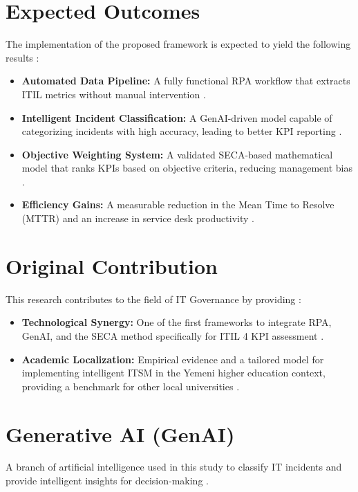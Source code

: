 \documentclass[12pt,a4paper,oneside]{report}
\begin{document}
\section{Expected Outcomes} 
The implementation of the proposed framework is expected to yield the following results \cite{almontaser2025}:
\begin{itemize}
    \item \textbf{Automated Data Pipeline:} A fully functional RPA workflow that extracts ITIL metrics without manual intervention \cite{almontaser2025}.
    \item \textbf{Intelligent Incident Classification:} A GenAI-driven model capable of categorizing incidents with high accuracy, leading to better KPI reporting \cite{almontaser2025}.
    \item \textbf{Objective Weighting System:} A validated SECA-based mathematical model that ranks KPIs based on objective criteria, reducing management bias \cite{almontaser2025}.
    \item \textbf{Efficiency Gains:} A measurable reduction in the Mean Time to Resolve (MTTR) and an increase in service desk productivity \cite{almontaser2025}.
\end{itemize}

\section{Original Contribution} 
This research contributes to the field of IT Governance by providing \cite{almontaser2025}:
\begin{itemize}
    \item \textbf{Technological Synergy:} One of the first frameworks to integrate RPA, GenAI, and the SECA method specifically for ITIL 4 KPI assessment \cite{almontaser2025}.
    \item \textbf{Academic Localization:} Empirical evidence and a tailored model for implementing intelligent ITSM in the Yemeni higher education context, providing a benchmark for other local universities \cite{almontaser2025}.
\end{itemize}

\section{Generative AI (GenAI)}
A branch of artificial intelligence used in this study to classify IT incidents and provide intelligent insights for decision-making \cite{almontaser2025}.
\end{document}

